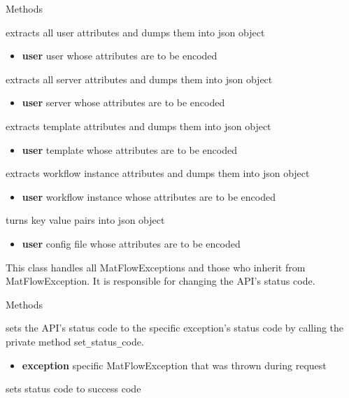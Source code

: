 \begin{methodenv}{Methods}

extracts all user attributes and dumps them into json object
\begin{itemize}
        \item \textbf{user}
        user whose attributes are to be encoded
\end{itemize}

extracts all server attributes and dumps them into json object
\begin{itemize}
        \item \textbf{user}
        server whose attributes are to be encoded
\end{itemize}

extracts template attributes and dumps them into json object
\begin{itemize}
        \item \textbf{user}
        template whose attributes are to be encoded
\end{itemize}

extracts workflow instance attributes and dumps them into json object
\begin{itemize}
        \item \textbf{user}
        workflow instance whose attributes are to be encoded
\end{itemize}

turns key value pairs into json object
\begin{itemize}
        \item \textbf{user}
        config file whose attributes are to be encoded
\end{itemize}

\end{methodenv}

This class handles all MatFlowExceptions and those who inherit from MatFlowException. It is  
responsible for changing the API's status code.

\begin{methodenv}{Methods}

sets the API's status code to the specific exception's status code by calling the private method
set\texttt{\_}status\texttt{\_}code.
\begin{itemize}
        \item \textbf{exception}
        specific MatFlowException that was thrown during request
\end{itemize}

sets status code to success code

\end{methodenv}

